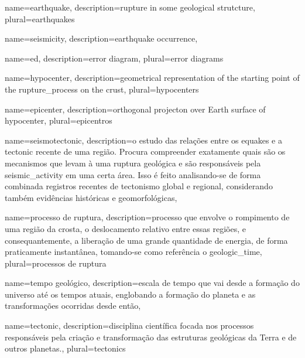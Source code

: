 {
	name={earthquake},
	description={rupture in some geological strutcture},
	plural={earthquakes}
}

{
	name={seismicity},
	description={earthquake occurrence},
}

{
	name={\gls{ed}},
	description={error diagram},
	plural={error diagrams}
}


{
	name={hypocenter},
	description={geometrical representation of the starting point of the \gls{rupture_process} on the \gls{crust}},
	plural={hypocenters}
}

{
	name={epicenter},
	description={orthogonal projecton over Earth surface of \gls{hypocenter}},
	plural={epicentros}
}


{
	name={seismotectonic},
	description={o estudo das relações entre os \glspl{equake} e a \gls{tectonic} recente de uma região.
				 Procura compreender exatamente quais são os mecanismos que levam à uma ruptura geológica 
				 e são responsáveis pela
				 \gls{seismic_activity} em uma certa área. Isso é feito analisando-se de forma combinada 
				 registros recentes de tectonismo global e regional, 
				 considerando também evidências históricas e geomorfológicas},
}


{
	name={processo de ruptura},
	description={processo que envolve o rompimento de uma região da crosta,
			o deslocamento relativo entre essas regiões, e consequantemente,
			a liberação de uma grande quantidade de energia, de forma praticamente
			instantânea, tomando-se como referência o \gls{geologic_time}},
	plural={processos de ruptura}
}


{
	name={tempo geológico},
	description={escala de tempo que vai desde a formação do universo até os tempos atuais,
				englobando a formação do planeta e as transformações ocorridas desde então},
}


{
	name={tectonic},
	description={disciplina científica focada nos processos respons\'aveis 
				 pela cria\c{c}\~ao e transforma\c{c}\~ao das estruturas geológicas da Terra e de outros planetas.},
	plural={tectonics}
}




